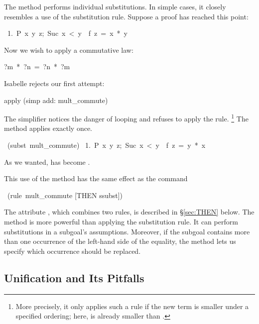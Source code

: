 The  method performs individual substitutions. In simple cases,
it closely resembles a use of the substitution rule.  Suppose a
proof has reached this point:
\begin{isabelle}
\ 1.\ \isasymlbrakk P\ x\ y\ z;\ Suc\ x\ <\ y\isasymrbrakk \ \isasymLongrightarrow \ f\ z\ =\ x\ *\ y%
\end{isabelle}
Now we wish to apply a commutative law:
\begin{isabelle}
?m\ *\ ?n\ =\ ?n\ *\ ?m%
\end{isabelle}
Isabelle rejects our first attempt:
\begin{isabelle}
apply (simp add: mult_commute)
\end{isabelle}
The simplifier notices the danger of looping and refuses to apply the
rule.%
\footnote{More precisely, it only applies such a rule if the new term is
smaller under a specified ordering; here, 
is already smaller than
.}
%
The  method applies  exactly once.  
\begin{isabelle}
\ (subst\ mult_commute)\isanewline
\ 1.\ \isasymlbrakk P\ x\ y\ z;\ Suc\ x\ <\ y\isasymrbrakk \
\isasymLongrightarrow \ f\ z\ =\ y\ *\ x%
\end{isabelle}
As we wanted,  has become .

\medskip
This use of the  method has the same effect as the command
\begin{isabelle}
\ (rule\ mult_commute [THEN ssubst])
\end{isabelle}
The attribute , which combines two rules, is described in 
{\S}\ref{sec:THEN} below. The \methdx{subst} method is more powerful than
applying the substitution rule. It can perform substitutions in a subgoal's
assumptions. Moreover, if the subgoal contains more than one occurrence of
the left-hand side of the equality, the \methdx{subst} method lets us specify which occurrence should be replaced.


\subsection{Unification and Its Pitfalls}

